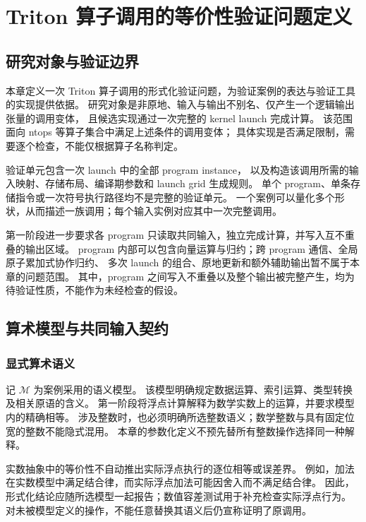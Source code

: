 
\chapter{Triton 算子调用的等价性验证问题定义}
\label{chap:operator-verification}

\section{研究对象与验证边界}
\label{sec:opv-scope}

本章定义一次 Triton 算子调用的形式化验证问题，为验证案例的表达与验证工具的实现提供依据。
研究对象是非原地、输入与输出不别名、仅产生一个逻辑输出张量的调用变体，
且候选实现通过一次完整的 kernel launch 完成计算。
该范围面向 ntops 等算子集合中满足上述条件的调用变体；
具体实现是否满足限制，需要逐个检查，不能仅根据算子名称判定。

验证单元包含一次 launch 中的全部 program instance，
以及构造该调用所需的输入映射、存储布局、编译期参数和 launch grid 生成规则。
单个 program、单条存储指令或一次符号执行路径均不是完整的验证单元。
一个案例可以量化多个形状，从而描述一族调用；每个输入实例对应其中一次完整调用。

第一阶段进一步要求各 program 只读取共同输入，独立完成计算，并写入互不重叠的输出区域。
program 内部可以包含向量运算与归约；跨 program 通信、全局原子累加式协作归约、
多次 launch 的组合、原地更新和额外辅助输出暂不属于本章的问题范围。
其中，program 之间写入不重叠以及整个输出被完整产生，均为待验证性质，不能作为未经检查的假设。

\section{算术模型与共同输入契约}
\label{sec:opv-contract}

\subsection{显式算术语义}

记 $\mathcal{M}$ 为案例采用的语义模型。
该模型明确规定数据运算、索引运算、类型转换及相关原语的含义。
第一阶段将浮点计算解释为数学实数上的运算，并要求模型内的精确相等。
涉及整数时，也必须明确所选整数语义；数学整数与具有固定位宽的整数不能隐式混用。
本章的参数化定义不预先替所有整数操作选择同一种解释。

实数抽象中的等价性不自动推出实际浮点执行的逐位相等或误差界。
例如，加法在实数模型中满足结合律，而实际浮点加法可能因舍入而不满足结合律。
因此，形式化结论应随所选模型一起报告；数值容差测试用于补充检查实际浮点行为。
对未被模型定义的操作，不能任意替换其语义后仍宣称证明了原调用。

